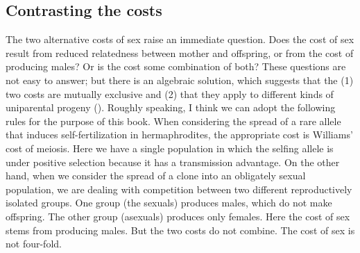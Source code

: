 \documentclass[
  letterpaper,
]{book}
\begin{document}
\subsection{Contrasting the costs}\label{contrasting-the-costs}

The two alternative costs of sex raise an immediate question. Does the
cost of sex result from reduced relatedness between mother and
offspring, or from the cost of producing males? Or is the cost some
combination of both? These questions are not easy to answer; but there
is an algebraic solution, which suggests that the (1) two costs are
mutually exclusive and (2) that they apply to different kinds of
uniparental progeny ().
Roughly speaking, I think we can adopt the following rules for the
purpose of this book. When considering the spread of a rare allele that
induces self-fertilization in hermaphrodites, the appropriate cost is
Williams' cost of meiosis. Here we have a single population in which the
selfing allele is under positive selection because it has a transmission
advantage. On the other hand, when we consider the spread of a clone
into an obligately sexual population, we are dealing with competition
between two different reproductively isolated groups. One group (the
sexuals) produces males, which do not make offspring. The other group
(asexuals) produces only females. Here the cost of sex stems from
producing males. But the two costs do not combine. The cost of sex is
not four-fold.
\end{document}
